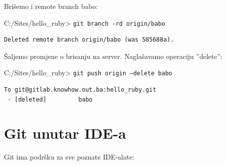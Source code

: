 \documentclass[times, utf8, seminar]{fit}
\begin{document}
Brišemo i remote branch babo:

C:/Sites/hello\_ruby> \texttt{git branch -rd origin/babo}
\begin{lstlisting}
Deleted remote branch origin/babo (was 585688a).
\end{lstlisting}

Šaljemo promjene o brisanju na server. Naglašavamo operaciju ''delete'':

C:/Sites/hello\_ruby> \texttt{git push origin --delete babo}
\begin{lstlisting}
To git@gitlab.knowhow.out.ba:hello_ruby.git
 - [deleted]         babo
\end{lstlisting}

\section{Git unutar IDE-a}

Git ima podršku za sve poznate IDE-alate:
\end{document}
